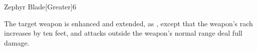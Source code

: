 \begin{spellsection}{Zephyr Blade}[Greater]{6}
\begin{spellheader}
    \begin{spelltargetinginfo}
    \end{spelltargetinginfo}
\end{spellheader}
\begin{spellcontent}
    \begin{spelleffects}
        \spelleffect The target weapon is enhanced and extended, as , except that the weapon's rach increases by ten feet, and attacks outside the weapon's normal range deal full damage.
        \spelldur \durshort
    \end{spelleffects}
\end{spellcontent}
\begin{spellfooter}
\end{spellfooter}
\end{spellsection}
